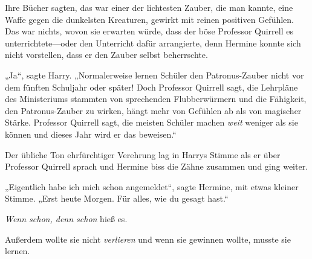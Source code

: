 Ihre Bücher sagten, das war einer der lichtesten Zauber, die man kannte, eine Waffe gegen die dunkelsten Kreaturen, gewirkt mit reinen positiven Gefühlen. Das war nichts, wovon sie erwarten würde, dass der böse Professor Quirrell es unterrichtete—oder den Unterricht dafür arrangierte, denn Hermine konnte sich nicht vorstellen, dass er den Zauber selbst beherrschte.

„Ja“, sagte Harry. „Normalerweise lernen Schüler den Patronus-Zauber nicht vor dem fünften Schuljahr oder später! Doch Professor Quirrell sagt, die Lehrpläne des Ministeriums stammten von sprechenden Flubberwürmern und die Fähigkeit, den Patronus-Zauber zu wirken, hängt mehr von Gefühlen ab als von magischer Stärke. Professor Quirrell sagt, die meisten Schüler machen \emph{weit} weniger als sie können und dieses Jahr wird er das beweisen.“

Der übliche Ton ehrfürchtiger Verehrung lag in Harrys Stimme als er über Professor Quirrell sprach und Hermine biss die Zähne zusammen und ging weiter.

„Eigentlich habe ich mich schon angemeldet“, sagte Hermine, mit etwas kleiner Stimme. „Erst heute Morgen. Für alles, wie du gesagt hast.“

\emph{Wenn schon, denn schon} hieß es.

Außerdem wollte sie nicht \emph{verlieren} und wenn sie gewinnen wollte, musste sie lernen.

